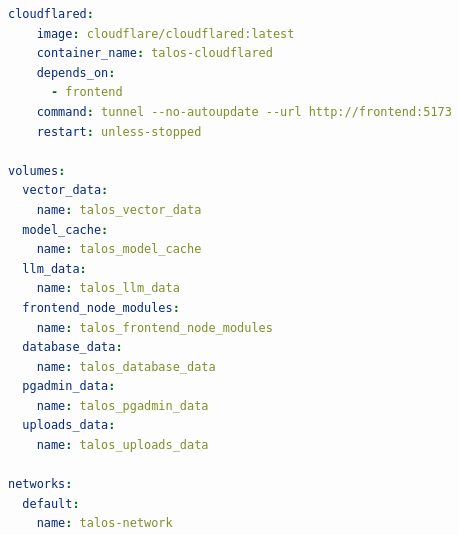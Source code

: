 \begin{lstlisting}[language=yaml, caption={Configurazione Docker Compose del sistema T.A.L.O.S.}, label={lst:docker-compose}]
  cloudflared:
    image: cloudflare/cloudflared:latest
    container_name: talos-cloudflared
    depends_on:
      - frontend
    command: tunnel --no-autoupdate --url http://frontend:5173
    restart: unless-stopped

volumes:
  vector_data:
    name: talos_vector_data
  model_cache:
    name: talos_model_cache
  llm_data:
    name: talos_llm_data
  frontend_node_modules:
    name: talos_frontend_node_modules
  database_data:
    name: talos_database_data
  pgadmin_data:
    name: talos_pgadmin_data
  uploads_data:
    name: talos_uploads_data

networks:
  default:
    name: talos-network

\end{lstlisting}
